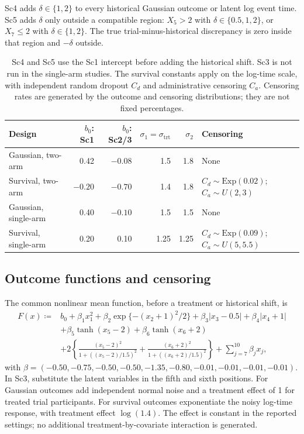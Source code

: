 Sc4 adds $\delta\in\{1,2\}$ to every historical Gaussian outcome or latent log event time. Sc5 adds $\delta$ only outside a compatible region: $X_5>2$ with $\delta\in\{0.5,1,2\}$, or $X_7\leq2$ with $\delta\in\{1,2\}$. The true trial-minus-historical discrepancy is zero inside that region and $-\delta$ outside. 

\begin{table}[htbp]
\centering\small
\caption{Design-specific data-generating constants.}\label{tab:S2}
\begin{tabular}{p{1.25in}rrrrp{1.1in}}
\toprule
Design & $b_0$: Sc1 & $b_0$: Sc2/3 & $\sigma_1=\sigma_{\mathrm{trt}}$ & $\sigma_2$ & Censoring\\\midrule
Gaussian, two-arm & 0.42 & $-0.08$ & 1.5 & 1.8 & None\\
Survival, two-arm & $-0.20$ & $-0.70$ & 1.4 & 1.8 & $C_d\sim\mathrm{Exp}(0.02)$; $C_a\sim U(2,3)$\\
Gaussian, single-arm & 0.40 & $-0.10$ & 1.5 & 1.5 & None\\
Survival, single-arm & 0.20 & 0.10 & 1.25 & 1.25 & $C_d\sim\mathrm{Exp}(0.09)$; $C_a\sim U(5,5.5)$\\
\bottomrule
\end{tabular}
\caption*{Sc4 and Sc5 use the Sc1 intercept before adding the historical shift. Sc3 is not run in the single-arm studies. The survival constants apply on the log-time scale, with independent random dropout $C_d$ and administrative censoring $C_a$. Censoring rates are generated by the outcome and censoring distributions; they are not fixed percentages.}
\end{table}

\subsection{Outcome functions and censoring}\label{sec:E.2}
The common nonlinear mean function, before a treatment or historical shift, is
\begin{equation}\label{eq:dgp}
\begin{aligned}
F(x)\coloneqq {}&b_0+\beta_1x_1^2+\beta_2\exp\{-(x_2+1)^2/2\}
+\beta_3|x_3-0.5|+\beta_4|x_4+1|\\
&+\beta_5\tanh(x_5-2)+\beta_6\tanh(x_6+2)\\
&+2\left\{\frac{(x_5-2)^2}{1+((x_5-2)/1.5)^2}
+\frac{(x_6+2)^2}{1+((x_6+2)/1.5)^2}\right\}
+\sum_{j=7}^{10}\beta_jx_j,
\end{aligned}
\end{equation}
with $\beta=(-0.50,-0.75,-0.50,-0.50,-1.35,-0.80,-0.01,-0.01,-0.01,-0.01)$. In Sc3, substitute the latent variables in the fifth and sixth positions. For Gaussian outcomes add independent normal noise and a treatment effect of 1 for treated trial participants. For survival outcomes exponentiate the noisy log-time response, with treatment effect $\log(1.4)$. The effect is constant in the reported settings; no additional treatment-by-covariate interaction is generated.

